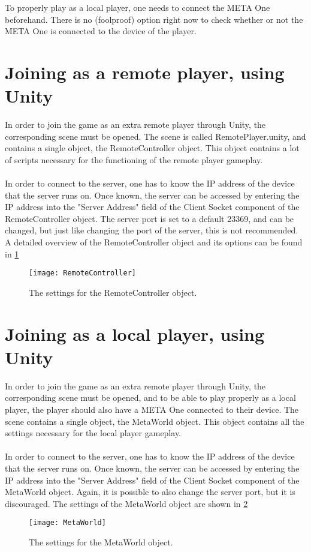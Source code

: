 \documentclass[]{report}
\begin{document}
To properly play as a local player, one needs to connect the META One beforehand.
There is no (foolproof) option right now to check whether or not the META One is
connected to the device of the player.

\section*{Joining as a remote player, using Unity}
In order to join the game as an extra remote player through Unity, the corresponding
scene must be opened. The scene is called RemotePlayer.unity, and contains a single object,
the RemoteController object. This object contains a lot of scripts necessary
for the functioning of the remote player gameplay.\\
\\
In order to connect to the server, one has to know the IP address of the
device that the server runs on. Once known, the server can be accessed by
entering the IP address into the "Server Address" field of the Client Socket
component of the RemoteController object. The server port is set to a default
23369, and can be changed, but just like changing the port of the server,
this is not recommended. A detailed overview of the RemoteController object
and its options can be found in \ref{fig:remotecontroller}
\begin{figure}[!ht]
    \centering
    \texttt{[image: RemoteController]}
    \caption{The settings for the RemoteController object.}
    \label{fig:remotecontroller}
\end{figure}

\section*{Joining as a local player, using Unity}
In order to join the game as an extra remote player through Unity, the 
corresponding scene must be opened, and to be able
to play properly as a local player, the player should also have a META One
connected to their device. The scene contains a single object, the MetaWorld object. This object
contains all the settings necessary for the local player gameplay.\\
\\
In order to connect to the server, one has to know the IP address of the
device that the server runs on. Once known, the server can be accessed by
entering the IP address into the "Server Address" field of the Client Socket
component of the MetaWorld object. Again, it is possible to also change the
server port, but it is discouraged. The settings of the MetaWorld object
are shown in \ref{fig:metaworld}

\begin{figure}[!ht]
    \centering
    \texttt{[image: MetaWorld]}
    \caption{The settings for the MetaWorld object.}
    \label{fig:metaworld}
\end{figure}
\end{document}

